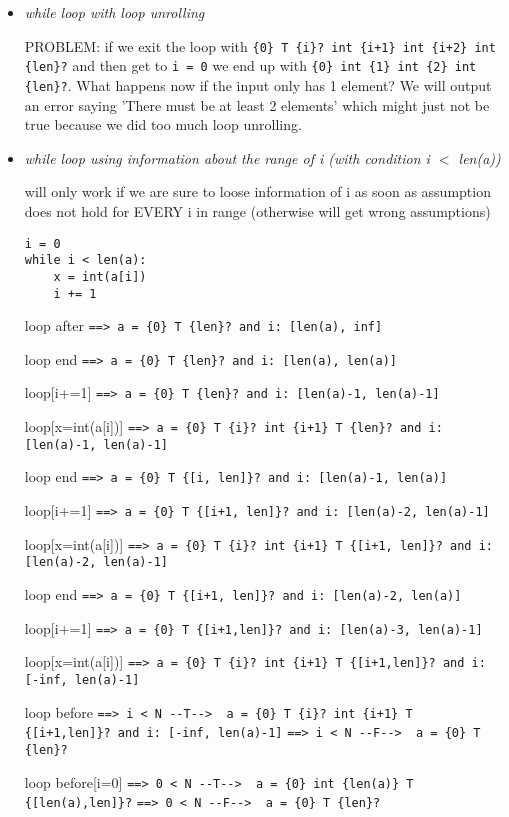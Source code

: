 \documentclass[11pt]{article}
\begin{document}
\begin{itemize}

\item \textit{while loop with loop unrolling}

PROBLEM: if we exit the loop with \verb|{0} T {i}? int {i+1} int {i+2} int {len}?| and then get to \verb|i = 0| we end up with \verb|{0} int {1} int {2} int {len}?|. What happens now if the input only has 1 element? We will output an error saying 'There must be at least 2 elements' which might just not be true because we did too much loop unrolling.

\item \textit{while loop using information about the range of i (with condition i $<$ len(a))}

will only work if we are sure to loose information of i as soon as assumption does not hold for EVERY i in range (otherwise will get wrong assumptions)

\begin{lstlisting}[numbers=none]
i = 0
while i < len(a):
    x = int(a[i])
    i += 1
\end{lstlisting}

loop after \verb|==> a = {0} T {len}? and i: [len(a), inf]|

loop end \verb|==> a = {0} T {len}? and i: [len(a), len(a)]|

loop[i+=1] \verb|==> a = {0} T {len}? and i: [len(a)-1, len(a)-1]|

loop[x=int(a[i])] \verb|==> a = {0} T {i}? int {i+1} T {len}? and i: [len(a)-1, len(a)-1]|

loop end \verb|==> a = {0} T {[i, len]}? and i: [len(a)-1, len(a)]|

loop[i+=1] \verb|==> a = {0} T {[i+1, len]}? and i: [len(a)-2, len(a)-1]|

loop[x=int(a[i])] \verb|==> a = {0} T {i}? int {i+1} T {[i+1, len]}? and i: [len(a)-2, len(a)-1]|

loop end \verb|==> a = {0} T {[i+1, len]}? and i: [len(a)-2, len(a)]|

loop[i+=1] \verb|==> a = {0} T {[i+1,len]}? and i: [len(a)-3, len(a)-1]|

loop[x=int(a[i])] \verb|==> a = {0} T {i}? int {i+1} T {[i+1,len]}? and i: [-inf, len(a)-1]|

loop before \verb|==> i < N --T-->  a = {0} T {i}? int {i+1} T {[i+1,len]}? and i: [-inf, len(a)-1]| \verb|==> i < N --F-->  a = {0} T {len}?|

loop before[i=0] \verb|==> 0 < N --T-->  a = {0} int {len(a)} T {[len(a),len]}?| \verb|==> 0 < N --F-->  a = {0} T {len}?|



\end{itemize}
\end{document}
